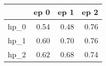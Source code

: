 \begin{tabular}{lrrr}
\toprule
{} &  ep 0 &  ep 1 &  ep 2 \\
\midrule
hp\_0 &  0.54 &  0.48 &  0.76 \\
hp\_1 &  0.60 &  0.70 &  0.76 \\
hp\_2 &  0.62 &  0.68 &  0.74 \\
\bottomrule
\end{tabular}

